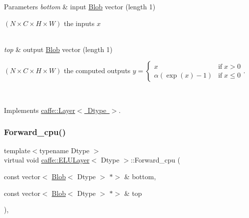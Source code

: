 \begin{DoxyParams}{Parameters}
{\em bottom} & input \mbox{\hyperlink{classcaffe_1_1_blob}{Blob}} vector (length 1)
\begin{DoxyEnumerate}
\item $ (N \times C \times H \times W) $ the inputs $ x $ 
\end{DoxyEnumerate}\\
\hline
{\em top} & output \mbox{\hyperlink{classcaffe_1_1_blob}{Blob}} vector (length 1)
\begin{DoxyEnumerate}
\item $ (N \times C \times H \times W) $ the computed outputs $ y = \left\{ \begin{array}{lr} x & \mathrm{if} \; x > 0 \\ \alpha (\exp(x)-1) & \mathrm{if} \; x \le 0 \end{array} \right. $. 
\end{DoxyEnumerate}\\
\hline
\end{DoxyParams}


Implements \mbox{\hyperlink{classcaffe_1_1_layer_a576ac6a60b1e99fe383831f52a6cea77}{caffe\+::\+Layer$<$ Dtype $>$}}.

\mbox{\label{classcaffe_1_1_e_l_u_layer_a8020273613906e572c3ff5d8d71eb1a7}} 
\subsubsection{\texorpdfstring{Forward\+\_\+cpu()}{Forward\_cpu()}\hspace{0.1cm}{\footnotesize\ttfamily [2/2]}}
{\footnotesize\ttfamily template$<$typename Dtype $>$ \\
virtual void \mbox{\hyperlink{classcaffe_1_1_e_l_u_layer}{caffe\+::\+E\+L\+U\+Layer}}$<$ Dtype $>$\+::Forward\+\_\+cpu (\begin{DoxyParamCaption}\item[{const vector$<$ \mbox{\hyperlink{classcaffe_1_1_blob}{Blob}}$<$ Dtype $>$ $\ast$$>$ \&}]{bottom,  }\item[{const vector$<$ \mbox{\hyperlink{classcaffe_1_1_blob}{Blob}}$<$ Dtype $>$ $\ast$$>$ \&}]{top }\end{DoxyParamCaption})\hspace{0.3cm}{\ttfamily [protected]}, {\ttfamily [virtual]}}


